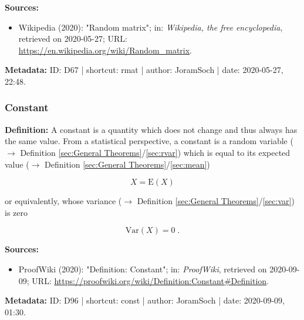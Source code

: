 \documentclass[a4paper,12pt,twoside]{book}
\begin{document}
\vspace{1em}
\textbf{Sources:}
\begin{itemize}
\item Wikipedia (2020): "Random matrix"; in: \textit{Wikipedia, the free encyclopedia}, retrieved on 2020-05-27; URL: \url{https://en.wikipedia.org/wiki/Random_matrix}.
\end{itemize}


\vspace{1em}
\textbf{Metadata:} ID: D67 | shortcut: rmat | author: JoramSoch | date: 2020-05-27, 22:48.
\vspace{1em}



\subsubsection[\textit{Constant}]{Constant} \label{sec:const}
\setcounter{equation}{0}

\textbf{Definition:} A constant is a quantity which does not change and thus always has the same value. From a statistical perspective, a constant is a random variable ($\rightarrow$ Definition \ref{sec:General Theorems}/\ref{sec:rvar}) which is equal to its expected value ($\rightarrow$ Definition \ref{sec:General Theorems}/\ref{sec:mean})

\begin{equation} \label{eq:const-EX}
X = \mathrm{E}(X)
\end{equation}

or equivalently, whose variance ($\rightarrow$ Definition \ref{sec:General Theorems}/\ref{sec:var}) is zero

\begin{equation} \label{eq:const-VarX}
\mathrm{Var}(X) = 0 \; .
\end{equation}


\vspace{1em}
\textbf{Sources:}
\begin{itemize}
\item ProofWiki (2020): "Definition: Constant"; in: \textit{ProofWiki}, retrieved on 2020-09-09; URL: \url{https://proofwiki.org/wiki/Definition:Constant#Definition}.
\end{itemize}


\vspace{1em}
\textbf{Metadata:} ID: D96 | shortcut: const | author: JoramSoch | date: 2020-09-09, 01:30.
\vspace{1em}
\end{document}
